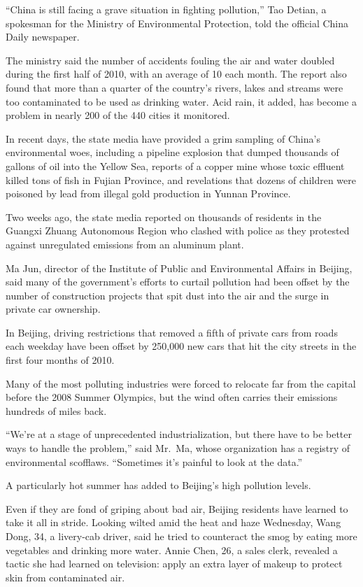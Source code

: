 ﻿\documentclass[12pt]{article}
\begin{document}
``China is still facing a grave situation in fighting pollution,'' Tao Detian, a spokesman for the
Ministry of Environmental Protection, told the official China Daily newspaper.

The ministry said the number of accidents fouling the air and water doubled during the first half of
2010, with an average of 10 each month. The report also found that more than a quarter of the
country's rivers, lakes and streams were too contaminated to be used as drinking water. Acid rain,
it added, has become a problem in nearly 200 of the 440 cities it monitored.

In recent days, the state media have provided a grim sampling of China's environmental woes,
including a pipeline explosion that dumped thousands of gallons of oil into the Yellow Sea, reports
of a copper mine whose toxic effluent killed tons of fish in Fujian Province, and revelations that
dozens of children were poisoned by lead from illegal gold production in Yunnan Province.

Two weeks ago, the state media reported on thousands of residents in the Guangxi Zhuang Autonomous
Region who clashed with police as they protested against unregulated emissions from an aluminum
plant.

Ma Jun, director of the Institute of Public and Environmental Affairs in Beijing, said many of the
government's efforts to curtail pollution had been offset by the number of construction projects
that spit dust into the air and the surge in private car ownership.

In Beijing, driving restrictions that removed a fifth of private cars from roads each weekday have
been offset by 250,000 new cars that hit the city streets in the first four months of 2010.

Many of the most polluting industries were forced to relocate far from the capital before the 2008
Summer Olympics, but the wind often carries their emissions hundreds of miles back.

``We're at a stage of unprecedented industrialization, but there have to be better ways to handle
the problem,'' said Mr.~Ma, whose organization has a registry of environmental scofflaws.
``Sometimes it's painful to look at the data.''

A particularly hot summer has added to Beijing's high pollution levels.

Even if they are fond of griping about bad air, Beijing residents have learned to take it all in
stride. Looking wilted amid the heat and haze Wednesday, Wang Dong, 34, a livery-cab driver, said he
tried to counteract the smog by eating more vegetables and drinking more water. Annie Chen, 26, a
sales clerk, revealed a tactic she had learned on television: apply an extra layer of makeup to
protect skin from contaminated air.
\end{document}
